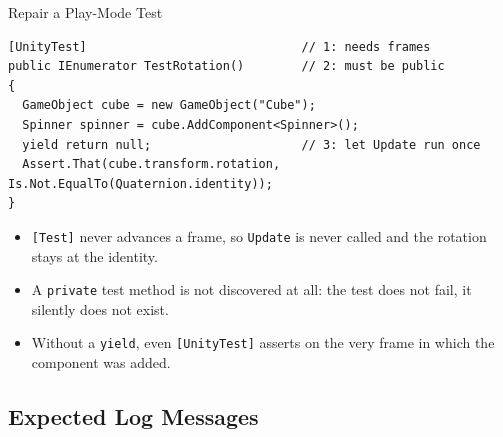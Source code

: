 \begin{solutionframe}{Repair a Play-Mode Test}
  \begin{lstlisting}[basicstyle=\scriptsize\ttfamily]
[UnityTest]                              // 1: needs frames
public IEnumerator TestRotation()        // 2: must be public
{
  GameObject cube = new GameObject("Cube");
  Spinner spinner = cube.AddComponent<Spinner>();
  yield return null;                     // 3: let Update run once
  Assert.That(cube.transform.rotation, Is.Not.EqualTo(Quaternion.identity));
}
  \end{lstlisting}
  \begin{itemize}
    \item \texttt{[Test]} never advances a frame, so \texttt{Update} is never
      called and the rotation stays at the identity.
    \item A \texttt{private} test method is not discovered at all: the test does
      not fail, it silently does not exist.
    \item Without a \texttt{yield}, even \texttt{[UnityTest]} asserts on the
      very frame in which the component was added.
  \end{itemize}
  \vspace{1ex}

\end{solutionframe}

\subsection{Expected Log Messages}

